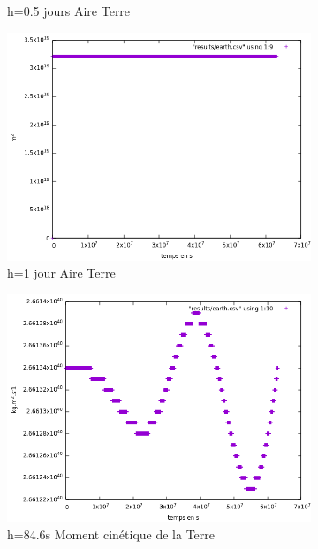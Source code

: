 \documentclass[11pt]{article}
\begin{document}
\begin{figure}[H]
\begin{subfigure}{0.5\textwidth}
\caption{h=0.5 jours Aire Terre}
\label{fig:3subim2}
\end{subfigure}
\begin{subfigure}{0.5\textwidth}
\includegraphics[width=1\linewidth]{modelisations/h=j/aire_terre_1.png}
\caption{h=1 jour Aire Terre}
\label{fig:3subim3}
\end{subfigure}
\begin{subfigure}{0.5\textwidth}
\includegraphics[width=1\linewidth]{modelisations/h=60s/mmc_terre.png}
\caption{h=84.6s Moment cinétique de la Terre}
\label{fig:4subim1}
\end{subfigure}
\begin{subfigure}{0.5\textwidth}

\end{subfigure}
\end{figure}
\end{document}
